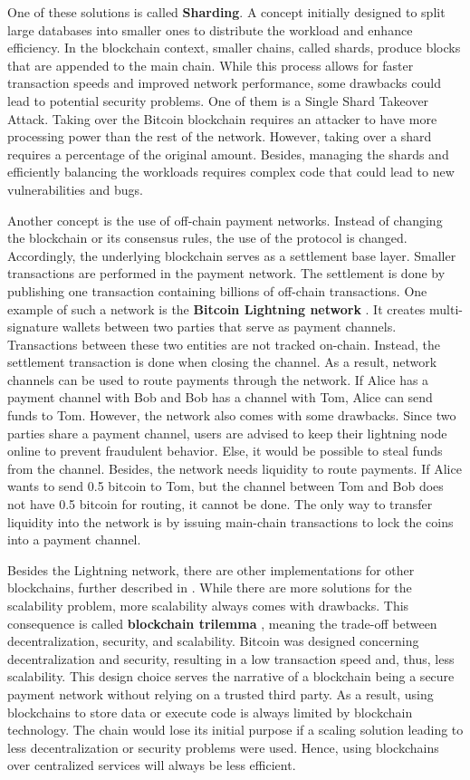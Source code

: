 One of these solutions is called \textbf{Sharding}. 
A concept initially designed to split large databases into smaller ones to distribute the workload and enhance efficiency.
In the blockchain context, smaller chains, called shards, produce blocks that are appended to the main chain.
While this process allows for faster transaction speeds and improved network performance, some drawbacks could lead to potential security problems.
One of them is a Single Shard Takeover Attack. 
Taking over the Bitcoin blockchain requires an attacker to have more processing power than the rest of the network.
However, taking over a shard requires a percentage of the original amount.
Besides, managing the shards and efficiently balancing the workloads requires complex code that could lead to new vulnerabilities and bugs. \cite{sharding_binance}

Another concept is the use of off-chain payment networks.
Instead of changing the blockchain or its consensus rules, the use of the protocol is changed.
Accordingly, the underlying blockchain serves as a settlement base layer.
Smaller transactions are performed in the payment network.
The settlement is done by publishing one transaction containing billions of off-chain transactions.
One example of such a network is the \textbf{Bitcoin Lightning network} \cite{poon2016}.
It creates multi-signature wallets between two parties that serve as payment channels.
Transactions between these two entities are not tracked on-chain. 
Instead, the settlement transaction is done when closing the channel. 
As a result, network channels can be used to route payments through the network.
If Alice has a payment channel with Bob and Bob has a channel with Tom, Alice can send funds to Tom.
However, the network also comes with some drawbacks.
Since two parties share a payment channel, users are advised to keep their lightning node online to prevent fraudulent behavior.
Else, it would be possible to steal funds from the channel.
Besides, the network needs liquidity to route payments. 
If Alice wants to send 0.5 bitcoin to Tom, but the channel between Tom and Bob does not have 0.5 bitcoin for routing, it cannot be done.
The only way to transfer liquidity into the network is by issuing main-chain transactions to lock the coins into a payment channel.

Besides the Lightning network, there are other implementations for other blockchains, further described in \cite{blockchain_scalability}.
While there are more solutions for the scalability problem, more scalability always comes with drawbacks.
This consequence is called \textbf{blockchain trilemma} \cite{blockchain_trilemma}, meaning the trade-off between decentralization, security, and scalability.
Bitcoin was designed concerning decentralization and security, resulting in a low transaction speed and, thus, less scalability.
This design choice serves the narrative of a blockchain being a secure payment network without relying on a trusted third party.
As a result, using blockchains to store data or execute code is always limited by blockchain technology.
The chain would lose its initial purpose if a scaling solution leading to less decentralization or security problems were used.
Hence, using blockchains over centralized services will always be less efficient.

